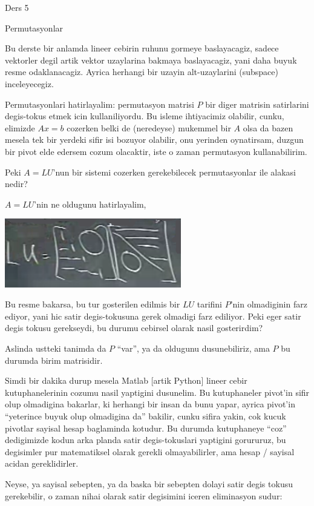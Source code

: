 \documentclass[12pt,fleqn]{article}\usepackage{../common}
\begin{document}
Ders 5

Permutasyonlar

Bu derste bir anlamda lineer cebirin ruhunu gormeye baslayacagiz, sadece
vektorler degil artik vektor uzaylarina bakmaya baslayacagiz, yani daha
buyuk resme odaklanacagiz. Ayrica herhangi bir uzayin alt-uzaylarini
(subspace) inceleyecegiz. 

Permutasyonlari hatirlayalim: permutasyon matrisi $P$ bir diger matrisin
satirlarini degis-tokus etmek icin kullaniliyordu. Bu isleme ihtiyacimiz
olabilir, cunku, elimizde $Ax=b$ cozerken belki de (neredeyse) mukemmel bir
$A$ olsa da bazen mesela tek bir yerdeki sifir isi bozuyor olabilir, onu
yerinden oynatirsam, duzgun bir pivot elde edersem cozum olacaktir, iste o
zaman permutasyon kullanabilirim.

Peki $A=LU$'nun bir sistemi cozerken gerekebilecek permutasyonlar ile
alakasi nedir?

$A=LU$'nin ne oldugunu hatirlayalim, 

\includegraphics[height=3cm]{5_01.png}

Bu resme bakarsa, bu tur gosterilen edilmis bir $LU$ tarifini $P$'nin
olmadiginin farz ediyor, yani hic satir degis-tokusuna gerek olmadigi farz
ediliyor. Peki eger satir degis tokusu gerekseydi, bu durumu cebirsel
olarak nasil gosterirdim? 

Aslinda ustteki tanimda da $P$ ``var'', ya da oldugunu dusunebiliriz, ama
$P$ bu durumda birim matrisidir. 

Simdi bir dakika durup mesela Matlab [artik Python] lineer cebir
kutuphanelerinin cozumu nasil yaptigini dusunelim. Bu kutuphaneler pivot'in
sifir olup olmadigina bakarlar, ki herhangi bir insan da bunu yapar, ayrica
pivot'in ``yeterince buyuk olup olmadigina da'' bakilir, cunku sifira
yakin, cok kucuk pivotlar sayisal hesap baglaminda kotudur. Bu durumda
kutuphaneye ``coz'' dedigimizde kodun arka planda satir degis-tokuslari
yaptigini gorururuz, bu degisimler pur matematiksel olarak gerekli
olmayabilirler, ama hesap / sayisal acidan gereklidirler. 

Neyse, ya sayisal sebepten, ya da baska bir sebepten dolayi satir degis
tokusu gerekebilir, o zaman nihai olarak satir degisimini iceren
eliminasyon sudur:
\end{document}
